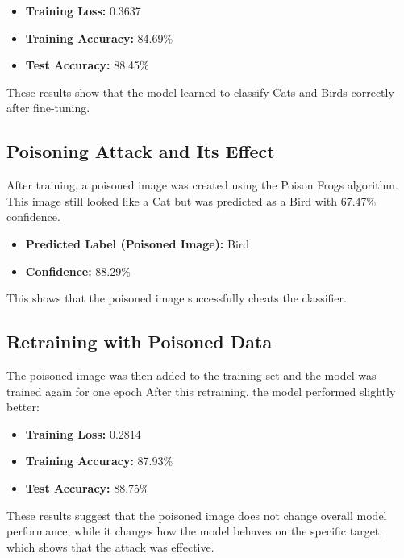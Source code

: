 \begin{itemize}
    \item \textbf{Training Loss:} 0.3637
    \item \textbf{Training Accuracy:} 84.69\%
    \item \textbf{Test Accuracy:} 88.45\%
\end{itemize}

These results show that the model learned to classify Cats and Birds correctly after fine-tuning.

\subsection{Poisoning Attack and Its Effect}

After training, a poisoned image was created using the Poison Frogs algorithm. This image still looked like a Cat but was predicted as a Bird with 67.47\% confidence.

\begin{itemize}
    \item \textbf{Predicted Label (Poisoned Image):} Bird
    \item \textbf{Confidence:} 88.29\%
\end{itemize}

This shows that the poisoned image successfully cheats the classifier.

\subsection{Retraining with Poisoned Data}

The poisoned image was then added to the training set and the model was trained again for one epoch After this retraining, the model performed slightly better:

\begin{itemize}
    \item \textbf{Training Loss:} 0.2814
    \item \textbf{Training Accuracy:} 87.93\%
    \item \textbf{Test Accuracy:} 88.75\%
\end{itemize}

These results suggest that the poisoned image does not change overall model performance, while it changes how the model behaves on the specific target, which shows that the attack was effective.

